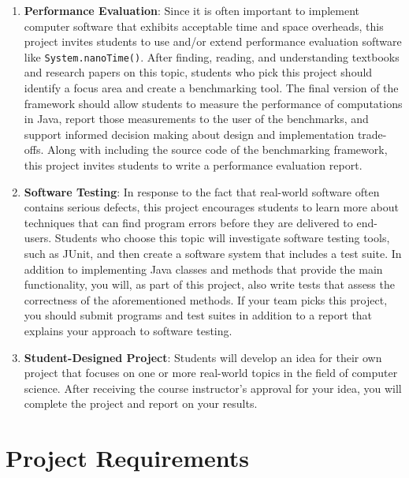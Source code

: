 \documentclass[11pt]{article}
\newcommand{\program}[1]{\lstinline{#1}}
\begin{document}
\begin{enumerate}
  \item {\bf Performance Evaluation}: Since it is often important to implement computer software that exhibits
    acceptable time and space overheads, this project invites students to use and/or extend performance evaluation
    software like \program{System.nanoTime()}. After finding, reading, and understanding textbooks and research papers
    on this topic, students who pick this project should identify a focus area and create a benchmarking tool. The final
    version of the framework should allow students to measure the performance of computations in Java, report those
    measurements to the user of the benchmarks, and support informed decision making about design and implementation
    trade-offs. Along with including the source code of the benchmarking framework, this project invites students to
    write a performance evaluation report.

  \item {\bf Software Testing}: In response to the fact that real-world software often contains serious defects, this
    project encourages students to learn more about techniques that can find program errors before they are delivered to
    end-users. Students who choose this topic will investigate software testing tools, such as JUnit, and then create
    a software system that includes a test suite. In addition to implementing Java classes and methods that provide the
    main functionality, you will, as part of this project, also write tests that assess the correctness of the
    aforementioned methods. If your team picks this project, you should submit programs and test suites in
    addition to a report that explains your approach to software testing.

  \item {\bf Student-Designed Project}: Students will develop an idea for their own project that focuses on one or more
    real-world topics in the field of computer science. After receiving the course instructor's approval for your idea,
    you will complete the project and report on your results.

\end{enumerate}

\section*{Project Requirements}
\end{document}
